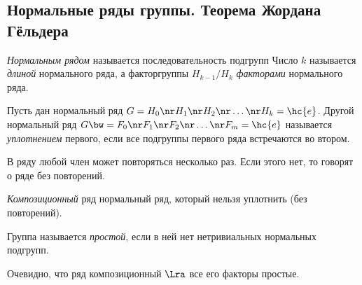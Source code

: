 \documentclass[a4paper]{article}
\begin{document}
\subsection{Нормальные ряды группы. Теорема Жордана Гёльдера}

\begin{df}
\emph{Нормальным рядом} называется последовательность подгрупп
Число $k$ называется \emph{длиной} нормального ряда,  а факторгруппы $H_{k-1}/H_k$ \emph{факторами} нормального ряда.
\end{df}

\begin{df}
Пусть дан нормальный ряд $G=H_0 \nr H_1 \nr H_2 \nr \ldots \nr H_k = \hc{e}$. Другой нормальный ряд
$G \bw= F_0 \nr F_1 \nr F_2 \nr \ldots \nr F_m = \hc{e}$ называется
\emph{уплотнением} первого, если все подгруппы первого ряда встречаются во втором.
\end{df}
В ряду любой член может повторяться несколько раз. Если этого нет, то говорят о ряде без повторений.

\begin{df}
\emph{Композиционный} ряд нормальный ряд, который нельзя уплотнить (без повторений).
\end{df}

\begin{df}
Группа называется \emph{простой}, если в ней нет нетривиальных нормальных подгрупп.
\end{df}

Очевидно, что ряд композиционный $\Lra$ все его факторы простые.
\end{document}
